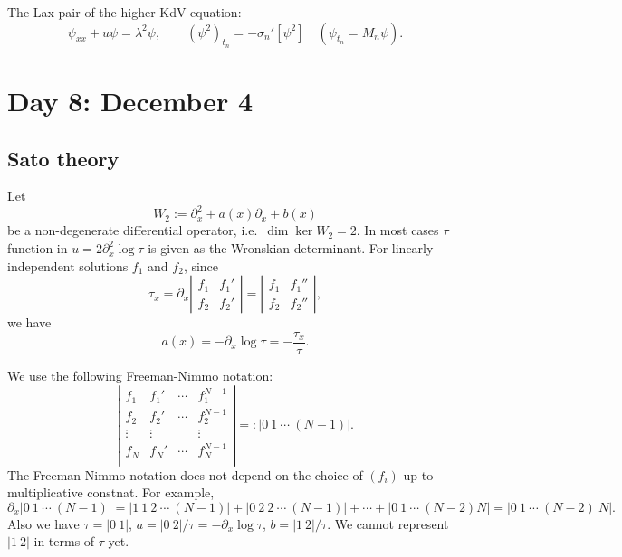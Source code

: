 \documentclass{../../../small}
\begin{document}
The Lax pair of the higher KdV equation:
\[\psi_{xx}+u\psi=\lambda^2\psi,\qquad (\psi^2)_{t_n}=-\sigma_n'[\psi^2]\quad(\psi_{t_n}=M_n\psi).\]



\newpage
\section{Day 8: December 4}

\subsection*{Sato theory}
Let
\[W_2:=\partial_x^2+a(x)\partial_x+b(x)\]
be a non-degenerate differential operator, i.e.~$\dim\ker W_2=2$.
In most cases $\tau$ function in $u=2\partial_x^2\log\tau$ is given as the Wronskian determinant.
For linearly independent solutions $f_1$ and $f_2$, since
\[\tau_x=\partial_x\left|\begin{matrix}f_1&f_1'\\f_2&f_2'\end{matrix}\right|=\left|\begin{matrix}f_1&f_1''\\f_2&f_2''\end{matrix}\right|,\]
we have
\[a(x)=-\partial_x\log\tau=-\frac{\tau_x}\tau.\]

We use the following Freeman-Nimmo notation:
\[\left|\begin{matrix}f_1&f_1'&\cdots&f_1^{N-1}\\f_2&f_2'&\cdots&f_2^{N-1}\\
\vdots&\vdots&&\vdots\\f_N&f_N'&\cdots&f_N^{N-1}\\\end{matrix}\right|=:|0\ 1\ \cdots\ (N-1)|.\]
The Freeman-Nimmo notation does not depend on the choice of $(f_i)$ up to multiplicative constnat.
For example,
\[\partial_x|0\ 1\ \cdots\ (N-1)|=|1\ 1\ 2\ \cdots\ (N-1)|+|0\ 2\ 2\ \cdots\ (N-1)|+\cdots+|0\ 1\ \cdots\ (N-2)N|=|0\ 1\ \cdots\ (N-2)\ N|.\]
Also we have $\tau=|0\ 1|$, $a=|0\ 2|/\tau=-\partial_x\log\tau$, $b=|1\ 2|/\tau$.
We cannot represent $|1\ 2|$ in terms of $\tau$ yet.
\end{document}
